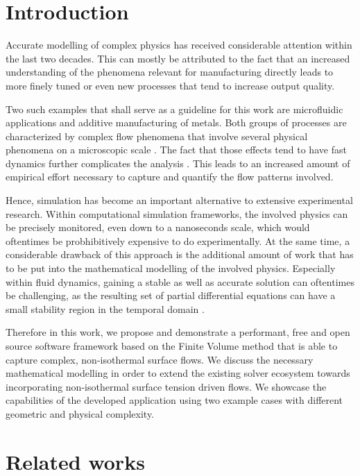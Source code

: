 \documentclass[conference,final,a4paper]{IEEEtran}
\begin{document}
\section{Introduction}

Accurate modelling of complex physics has received considerable attention within the last two decades.
This can mostly be attributed to the fact that an increased understanding of the phenomena relevant for manufacturing directly leads to more finely tuned or even new processes that tend to increase output quality.

Two such examples that shall serve as a guideline for this work are microfluidic applications and additive manufacturing of metals.
Both groups of processes are characterized by complex flow phenomena that involve several physical phenomena on a microscopic scale \cite{sackmannPresentFutureRole2014,debroyAdditiveManufacturingMetallic2018}. The fact that those effects tend to have fast dynamics further complicates the analysis \cite{khairallahControllingInterdependentMesonanosecond2020}. This leads to an increased amount of empirical effort necessary to capture and quantify the flow patterns involved.

Hence, simulation has become an important alternative to extensive experimental research. Within computational simulation frameworks, the involved physics can be precisely monitored, even down to a nanoseconds scale, which would oftentimes be probhibitively expensive to do experimentally. At the same time, a considerable drawback of this approach is the additional amount of work that has to be put into the mathematical modelling of the involved physics. Especially within fluid dynamics, gaining a stable as well as accurate solution can oftentimes be challenging, as the resulting set of partial differential equations can have a small stability region in the temporal domain \cite{laxStabilityDifferenceSchemes2013}.

Therefore in this work, we propose and demonstrate a performant, free and open source software framework based on the Finite Volume method that is able to capture complex, non-isothermal surface flows. We discuss the necessary mathematical modelling in order to extend the existing solver ecosystem towards incorporating non-isothermal surface tension driven flows. We showcase the capabilities of the developed application using two example cases with different geometric and physical complexity.

\section{Related works}
\end{document}
